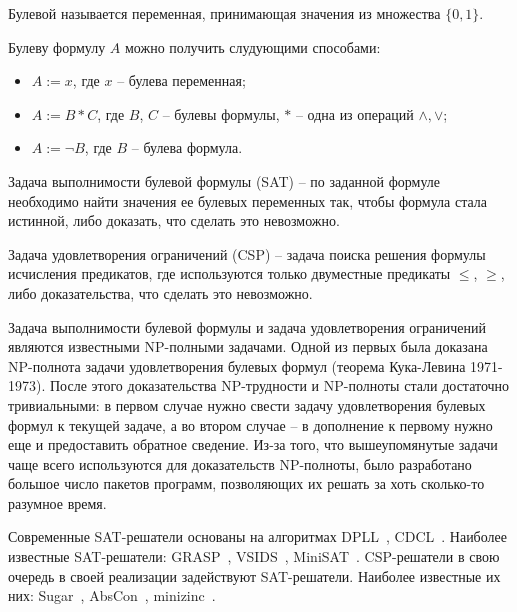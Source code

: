 \documentclass[times,specification,annotation]{itmo-student-thesis}
\begin{document}
\begin{definition}
  Булевой называется переменная, принимающая значения из множества $\{0, 1\}$.
\end{definition}

\begin{definition}
  Булеву формулу $A$ можно получить слудующими способами:
\begin{itemize}
  \item $A := x$, где $x$ -- булева переменная;
  \item $A := B * C$, где $B$, $C$ -- булевы формулы, $*$ -- одна из операций $\land, \lor$;
  \item $A := \neg B$, где $B$ -- булева формула.
\end{itemize}
\end{definition}

\begin{definition}
  Задача выполнимости булевой формулы (SAT) -- по заданной формуле необходимо найти значения ее булевых переменных так, чтобы формула стала истинной, либо доказать, что сделать это невозможно.
\end{definition}

\begin{definition}
  Задача удовлетворения ограничений (CSP) -- задача поиска решения формулы исчисления предикатов, где используются только двуместные предикаты $\leq$, $\geq$, либо доказательства, что сделать
  это невозможно.
\end{definition}

Задача выполнимости булевой формулы и задача удовлетворения ограничений являются известными NP-полными задачами. Одной из первых была доказана NP-полнота задачи удовлетворения
булевых формул (теорема Кука-Левина 1971-1973). После этого доказательства NP-трудности и NP-полноты стали достаточно тривиальными: в первом случае нужно свести задачу удовлетворения булевых формул
к текущей задаче, а во втором случае -- в дополнение к первому нужно еще и предоставить обратное сведение. Из-за того, что вышеупомянутые задачи чаще всего используются для
доказательств NP-полноты, было разработано большое число пакетов программ, позволяющих их решать за хоть сколько-то разумное время. 

Современные SAT-решатели основаны на алгоритмах DPLL~\cite{dpll}, CDCL~\cite{cdcl}. Наиболее известные SAT-решатели: GRASP~\cite{grasp}, VSIDS~\cite{vsids}, MiniSAT~\cite{minisat}. 
CSP-решатели в свою очередь в своей реализации задействуют SAT-решатели. Наиболее известные их них: Sugar~\cite{sugar}, AbsCon~\cite{abscon}, minizinc~\cite{minizinc}.
\end{document}

